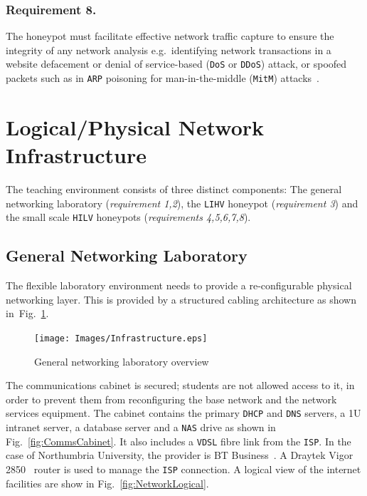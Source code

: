 \documentclass[10pt,journal]{IEEEtran}
\begin{document}
\subsubsection{Requirement 8.} 
The honeypot must facilitate effective network traffic capture to ensure the
integrity of any network analysis e.g.\ identifying network transactions in a
website defacement or denial of service-based (\texttt{DoS} or \texttt{DDoS})
attack, or spoofed packets such as in \texttt{ARP} poisoning for
man-in-the-middle (\texttt{MitM}) attacks~\cite{PS:16,RSKA:16}.

\section{Logical/Physical Network Infrastructure}\label{sec:LogicalDesign}

The teaching environment consists of three distinct components: The general
networking laboratory (\textit{requirement 1,2}), the \texttt{LIHV} honeypot
(\textit{requirement 3}) and the small scale \texttt{HILV} honeypots
(\textit{requirements 4,5,6,7,8}).

\subsection{General Networking Laboratory}

The flexible laboratory environment needs to provide a re-configurable physical
networking layer. This is provided by a structured cabling architecture as
shown in~Fig.~\ref{fig:Overview1}.

\begin{figure}[ht]
\begin{center}
	\texttt{[image: Images/Infrastructure.eps]}
\caption{General networking laboratory overview}
\label{fig:Overview1}
\end{center}
\end{figure}

The communications cabinet is secured; students are not allowed access to it,
in order to prevent them from reconfiguring the base network and the network
services equipment.  The cabinet contains the primary \texttt{DHCP} and
\texttt{DNS} servers, a 1U intranet server, a database server and a
\texttt{NAS} drive as shown in Fig.~\ref{fig:CommsCabinet}. It also includes a \texttt{VDSL} fibre link from the
\texttt{ISP}. In the case of Northumbria University, the provider is BT
Business~\cite{BT:17}. A Draytek Vigor 2850~\cite{DC:17} router is used to
manage the \texttt{ISP} connection. A logical view of the internet facilities are show in Fig.~\ref{fig:NetworkLogical}.
\end{document}
